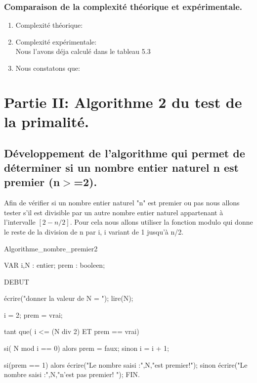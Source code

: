 \documentclass[12pt]{article}
\begin{document}
\subsubsection{Comparaison de la complexité théorique et expérimentale. }
\begin{enumerate}

	\item Complexité théorique:\\


	\item Complexité expérimentale:\\
	
	Nous l'avons déja calculé dans le tableau 5.3
	
	\item Nous constatons que:\\
	
	
\end{enumerate}


\section{Partie II: Algorithme 2 du test de la primalité.}

\subsection{Développement de l'algorithme qui permet de déterminer  si un nombre entier naturel n est premier (n$>$=2). }
Afin de vérifier si un nombre entier naturel "n" est premier ou pas nous allons tester s'il est divisible par un autre nombre entier naturel appartenant à l'intervalle $[2 - n/2]$.
Pour cela nous allons utiliser la fonction modulo qui donne le reste de la division de n par i, i variant de 1 jusqu'à n/2.


\begin{sql}

 Algorithme_nombre_premier2

 VAR
 i,N : entier;
 prem : booleen;
 
 DEBUT
 
	écrire("donner la valeur de N = ");
	lire(N);

	i = 2;
	prem = vrai;

	tant que( i <= (N div 2) ET prem == vrai){

		si( N mod i == 0)
			alors 
				prem = faux;				
			sinon
				i = i + 1;
	}

	si(prem == 1)
    	alors
        	écrire("Le nombre saisi :",N,"est premier!");
    	sinon
        	écrire("Le nombre saisi :",N,"n'est pas premier! ");
 FIN. 
 
\end{sql}
\end{document}

